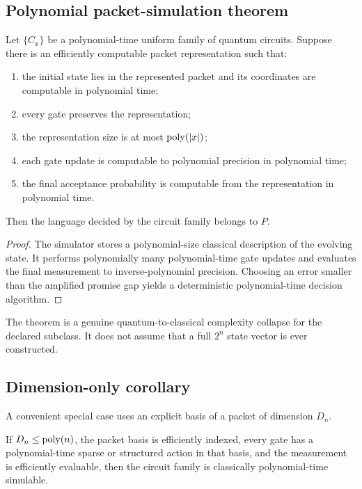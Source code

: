 \subsection{Polynomial packet-simulation theorem}
\begin{theorem}
\label{s:thm:poly-packet}
Let $\{C_x\}$ be a polynomial-time uniform family of quantum circuits. Suppose there is an efficiently computable packet representation such that:

\begin{enumerate}
\item the initial state lies in the represented packet and its coordinates are computable in polynomial time;
\item every gate preserves the representation;
\item the representation size is at most $\operatorname{poly}(|x|)$;
\item each gate update is computable to polynomial precision in polynomial time;
\item the final acceptance probability is computable from the representation in polynomial time.
\end{enumerate}

Then the language decided by the circuit family belongs to $P$.
\end{theorem}

\begin{proof}
The simulator stores a polynomial-size classical description of the evolving state. It performs polynomially many polynomial-time gate updates and evaluates the final measurement to inverse-polynomial precision. Choosing an error smaller than the amplified promise gap yields a deterministic polynomial-time decision algorithm.
\end{proof}

\begin{provedbox}
The theorem is a genuine quantum-to-classical complexity collapse for the declared subclass. It does not assume that a full $2^n$ state vector is ever constructed.
\end{provedbox}

\subsection{Dimension-only corollary}
A convenient special case uses an explicit basis of a packet of dimension $D_n$.

\begin{corollary}
If $D_n\le\operatorname{poly}(n)$, the packet basis is efficiently indexed, every gate has a polynomial-time sparse or structured action in that basis, and the measurement is efficiently evaluable, then the circuit family is classically polynomial-time simulable.
\end{corollary}

